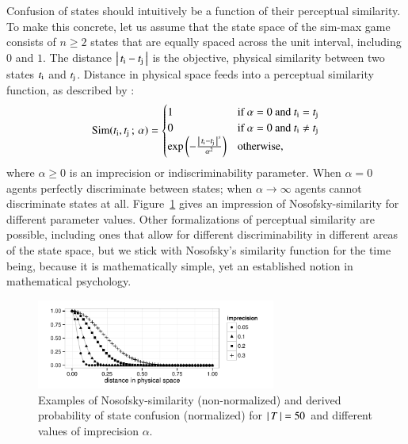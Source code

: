 \documentclass[fleqn,reqno,10pt]{article}
\newcommand{\impairment}{\ensuremath{\alpha}} %
\newcommand{\similarity}{\ensuremath{\mathrm{Sim}}} %
\begin{document}
Confusion of states should intuitively be a function of their
perceptual similarity. To make this concrete, let us assume that the
state space of the sim-max game consists of $n \ge 2$ states that are
equally spaced across the unit interval, including $0$ and $1$. The
distance $\left \lvert \, t_{\mathrm{i}} - t_{\mathrm{j}} \, \right\rvert$ is the objective, physical
similarity between two states $t_{\mathrm{i}}$ and
$t_{\mathrm{j}}$. Distance in physical space feeds into a perceptual
similarity function, as described by
\citet{Nosofsky1986:Attention-Simil}:
\begin{align*}
  \similarity(\mystate{i}, \mystate{j} \myts ; \myts \impairment) =
      \begin{cases}
    1 & \textrm{if } \impairment = 0 \textrm{ and } \mystate{i} = \mystate{j} \\
    0 & \textrm{if } \impairment = 0 \textrm{ and } \mystate{i} \neq \mystate{j} \\
 \expo \left ( -  \frac{\card{\mystate{i} - \mystate{j}}^s}{ \impairment^2} \right ) & \textrm{otherwise,} \\
    \end{cases}
\end{align*}
where $\impairment \ge 0$ is an imprecision or indiscriminability
parameter. When $\impairment=0$ agents perfectly discriminate between
states; when $\impairment \rightarrow \infty$ agents cannot
discriminate states at all. Figure~\ref{fig:NosofskySim} gives an
impression of Nosofsky-similarity for different parameter
values. Other formalizations of perceptual similarity are possible,
including ones that allow for different discriminability in different
areas of the state space, but we stick with Nosofsky's similarity
function for the time being, because it is mathematically simple, yet
an established notion in mathematical psychology.

\begin{figure}
  \centering

  \includegraphics[width=0.7\textwidth]{plots/NosofskySim.pdf}

  \caption{Examples of Nosofsky-similarity (non-normalized) and
    derived probability of state confusion (normalized) for
    $\left \lvert \, T \, \right\rvert = 50$ and different
    values of imprecision $\impairment$.}
  \label{fig:NosofskySim}
\end{figure}
\end{document}
